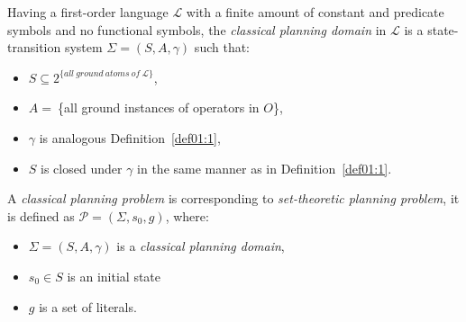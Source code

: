 \begin{defn}\label{def01:7}
Having a first-order language $\mathcal{L}$ with a finite amount of constant and predicate symbols and no functional symbols, the \emph{classical planning domain} in $\mathcal{L}$ is a state-transition system $\Sigma = (S,A,\gamma)$ such that:

    \begin{itemize}
        \item $S \subseteq 2^{\displaystyle \{all~ground~atoms~of~\mathcal{L}\}}$,
        
        \item $A =~$\{all ground instances of operators in $O$\},
        
        \item $\gamma$ is analogous Definition~\ref{def01:1},
        
        \item $S$ is closed under $\gamma$ in the same manner as in Definition~\ref{def01:1}.
    \end{itemize}
\end{defn}

\begin{defn}\label{def01:8}
A \emph{classical planning problem} is corresponding to \emph{set-theoretic planning problem}, it is defined as $\mathcal{P} = (\Sigma,s_0,g)$, where:

    \begin{itemize}
        \item $\Sigma = (S,A,\gamma)$ is a \emph{classical planning domain},
        
        \item $s_0 \in S$ is an initial state
        
        \item $g$ is a set of literals.
    \end{itemize}
\end{defn}
